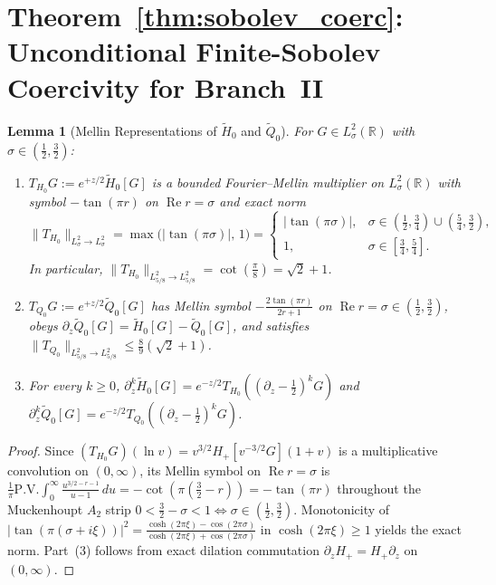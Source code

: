 \documentclass[11pt,a4paper]{article}
\newtheorem{lem}{Lemma}[section]
\begin{document}
\section{Theorem~\ref{thm:sobolev_coerc}: Unconditional Finite-Sobolev Coercivity for Branch~II}\label{sec:coercivity}

\begin{lem}[Mellin Representations of $\widetilde{H}_0$ and $\widetilde{Q}_0$]\label{lem:mellin}
For $G \in L^2_\sigma(\mathbb{R})$ with $\sigma \in (\frac{1}{2}, \frac{3}{2})$:
\begin{enumerate}
  \item $T_{H_0} G := e^{+z/2}\widetilde{H}_0[G]$ is a bounded Fourier--Mellin multiplier on $L^2_\sigma(\mathbb{R})$ with symbol $-\tan(\pi r)$ on $\operatorname{Re} r = \sigma$ and exact norm
  \[
  \|T_{H_0}\|_{L^2_\sigma \to L^2_\sigma} = \max\!\big(|\tan(\pi\sigma)|,\, 1\big) =
  \begin{cases}
  |\tan(\pi\sigma)|, & \sigma \in (\frac{1}{2}, \frac{3}{4}) \cup (\frac{5}{4}, \frac{3}{2}), \\
  1, & \sigma \in [\frac{3}{4}, \frac{5}{4}].
  \end{cases}
  \]
  In particular, $\|T_{H_0}\|_{L^2_{5/8}\to L^2_{5/8}} = \cot(\frac{\pi}{8}) = \sqrt{2} + 1$.
  \item $T_{Q_0} G := e^{+z/2}\widetilde{Q}_0[G]$ has Mellin symbol $-\frac{2\tan(\pi r)}{2r+1}$ on $\operatorname{Re} r = \sigma \in (\frac{1}{2}, \frac{3}{2})$, obeys $\partial_z\widetilde{Q}_0[G] = \widetilde{H}_0[G] - \widetilde{Q}_0[G]$, and satisfies $\|T_{Q_0}\|_{L^2_{5/8}\to L^2_{5/8}} \le \frac{8}{9}(\sqrt{2}+1)$.
  \item For every $k \ge 0$, $\partial_z^k\widetilde{H}_0[G] = e^{-z/2}T_{H_0}((\partial_z - \frac{1}{2})^k G)$ and $\partial_z^k\widetilde{Q}_0[G] = e^{-z/2}T_{Q_0}((\partial_z - \frac{1}{2})^k G)$.
\end{enumerate}
\end{lem}
\begin{proof}
Since $(T_{H_0}G)(\ln v) = v^{3/2}H_+[v^{-3/2}G](1+v)$ is a multiplicative convolution on $(0,\infty)$, its Mellin symbol on $\operatorname{Re} r = \sigma$ is $\frac{1}{\pi}\mathrm{P.V.}\int_0^\infty \frac{u^{3/2-r-1}}{u-1}\,du = -\cot(\pi(\frac{3}{2}-r)) = -\tan(\pi r)$ throughout the Muckenhoupt $A_2$ strip $0 < \frac{3}{2} - \sigma < 1 \iff \sigma \in (\frac{1}{2}, \frac{3}{2})$. Monotonicity of $|\tan(\pi(\sigma+i\xi))|^2 = \frac{\cosh(2\pi\xi)-\cos(2\pi\sigma)}{\cosh(2\pi\xi)+\cos(2\pi\sigma)}$ in $\cosh(2\pi\xi) \ge 1$ yields the exact norm. Part~(3) follows from exact dilation commutation $\partial_z H_+ = H_+ \partial_z$ on $(0,\infty)$.
\end{proof}
\end{document}
